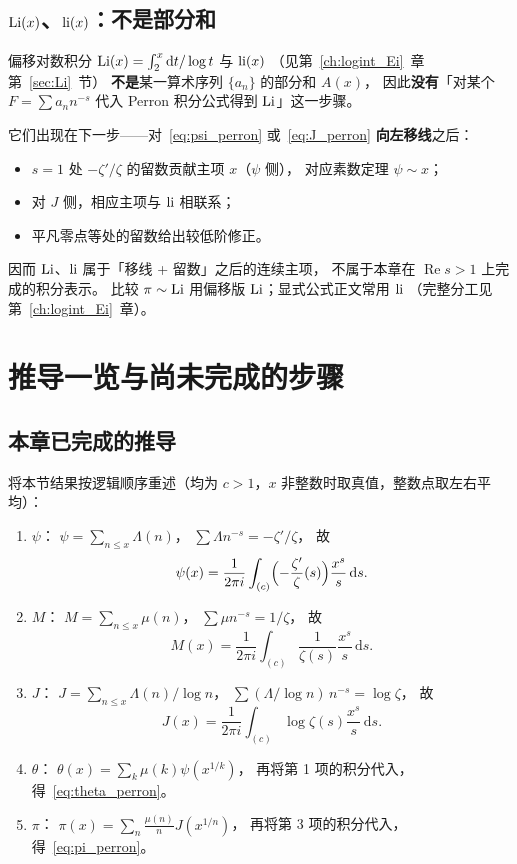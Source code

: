 \subsection{$\operatorname{Li}(x)$、$\operatorname{li}(x)$：不是部分和}

偏移对数积分 $\operatorname{Li}(x)=\int_2^x\mathrm{d}t/\log t$ 与 $\operatorname{li}(x)$
（见第~\ref{ch:logint_Ei}~章第~\ref{sec:Li}~节）
\textbf{不是}某一算术序列 $\{a_n\}$ 的部分和 $A(x)$，
因此\textbf{没有}「对某个 $F=\sum a_n n^{-s}$ 代入 Perron 积分公式得到 $\operatorname{Li}$」这一步骤。

它们出现在下一步——对~\eqref{eq:psi_perron} 或~\eqref{eq:J_perron}
\textbf{向左移线}之后：
\begin{itemize}
  \item $s=1$ 处 $-\zeta'/\zeta$ 的留数贡献主项 $x$（$\psi$ 侧），
        对应素数定理 $\psi\sim x$；
  \item 对 $J$ 侧，相应主项与 $\operatorname{li}$ 相联系；
  \item 平凡零点等处的留数给出较低阶修正。
\end{itemize}
因而 $\operatorname{Li}$、$\operatorname{li}$ 属于「移线 + 留数」之后的连续主项，
不属于本章在 $\operatorname{Re}s>1$ 上完成的积分表示。
比较 $\pi\sim\operatorname{Li}$ 用偏移版 $\operatorname{Li}$；显式公式正文常用 $\operatorname{li}$
（完整分工见第~\ref{ch:logint_Ei}~章）。


\section{推导一览与尚未完成的步骤}
\label{sec:what_remains}

\subsection{本章已完成的推导}

将本节结果按逻辑顺序重述（均为 $c>1$，$x$ 非整数时取真值，整数点取左右平均）：

\begin{enumerate}
  \item \textbf{$\psi$}：
        $\psi=\sum_{n\le x}\Lambda(n)$，
        $\sum\Lambda n^{-s}=-\zeta'/\zeta$，
        故
        \[
          \psi(x)
          =\frac{1}{2\pi i}\int_{(c)}\Bigl(-\frac{\zeta'}{\zeta}(s)\Bigr)\frac{x^s}{s}\,\mathrm{d}s.
        \]
  \item \textbf{$M$}：
        $M=\sum_{n\le x}\mu(n)$，
        $\sum\mu n^{-s}=1/\zeta$，
        故
        \[
          M(x)
          =\frac{1}{2\pi i}\int_{(c)}\frac{1}{\zeta(s)}\frac{x^s}{s}\,\mathrm{d}s.
        \]
  \item \textbf{$J$}：
        $J=\sum_{n\le x}\Lambda(n)/\log n$，
        $\sum(\Lambda/\log n)\,n^{-s}=\log\zeta$，
        故
        \[
          J(x)
          =\frac{1}{2\pi i}\int_{(c)}\log\zeta(s)\frac{x^s}{s}\,\mathrm{d}s.
        \]
  \item \textbf{$\theta$}：
        $\theta(x)=\sum_{k}\mu(k)\psi(x^{1/k})$，
        再将第 1 项的积分代入，得~\eqref{eq:theta_perron}。
  \item \textbf{$\pi$}：
        $\pi(x)=\sum_{n}\frac{\mu(n)}{n}J(x^{1/n})$，
        再将第 3 项的积分代入，得~\eqref{eq:pi_perron}。
\end{enumerate}

